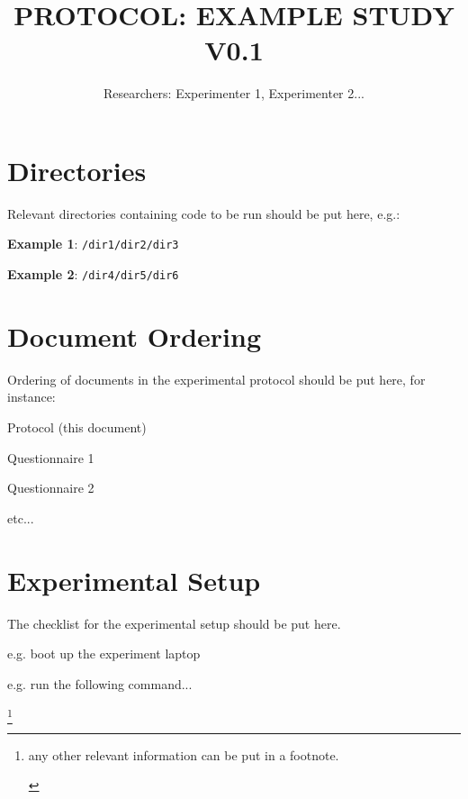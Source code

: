 \documentclass{study}
\begin{document}
\title{PROTOCOL: EXAMPLE STUDY V0.1}
\author{Researchers: Experimenter 1, Experimenter 2...}

\maketitle

\section*{Directories}

\begin{enumerate*}
  \item[] Relevant directories containing code to be run should be put here, e.g.:
  \item[] \textbf{Example 1}: \texttt{/dir1/dir2/dir3}
  \item[] \textbf{Example 2}: \texttt{/dir4/dir5/dir6}
\end{enumerate*}

\section*{Document Ordering}

\begin{enumerate*}
  \item Ordering of documents in the experimental protocol should be put here, for instance:
  \item Protocol (this document)
  \item Questionnaire 1
  \item Questionnaire 2
  \item etc...
\end{enumerate*}

\section*{Experimental Setup}
\begin{enumerate*}
  \item The checklist for the experimental setup should be put here.
  \item e.g. boot up the experiment laptop
  \item e.g. run the following command...
\end{enumerate*}

\footnote{\begin{enumerate*}
  \item[] any other relevant information can be put in a footnote.
\end{enumerate*}}
\end{document}
